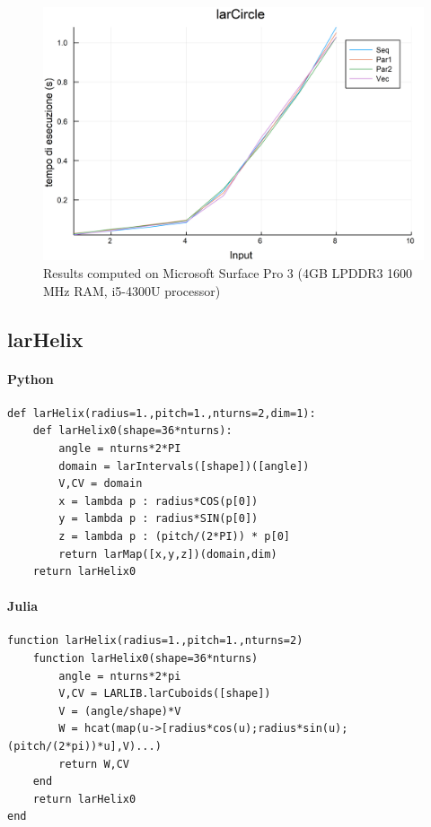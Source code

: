 \documentclass{article}
\begin{document}
\begin{figure}[htbp] 
\centering 
\includegraphics[scale=.13]{larCircleTime.png} 
\caption{Results computed on Microsoft Surface Pro  3 (4GB LPDDR3 1600 MHz RAM, i5-4300U processor)} 
\end{figure}

\subsection{larHelix}

\paragraph{Python}

\begin{verbatim}
def larHelix(radius=1.,pitch=1.,nturns=2,dim=1):
    def larHelix0(shape=36*nturns):
        angle = nturns*2*PI
        domain = larIntervals([shape])([angle])
        V,CV = domain
        x = lambda p : radius*COS(p[0])
        y = lambda p : radius*SIN(p[0])
        z = lambda p : (pitch/(2*PI)) * p[0]
        return larMap([x,y,z])(domain,dim)
    return larHelix0
\end{verbatim}

\paragraph{Julia}

\begin{verbatim}
function larHelix(radius=1.,pitch=1.,nturns=2)
    function larHelix0(shape=36*nturns)
        angle = nturns*2*pi
        V,CV = LARLIB.larCuboids([shape])
        V = (angle/shape)*V 
        W = hcat(map(u->[radius*cos(u);radius*sin(u);(pitch/(2*pi))*u],V)...)
        return W,CV
    end
    return larHelix0
end 
\end{verbatim}
\end{document}
